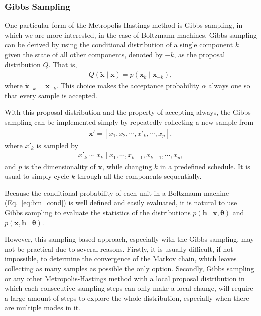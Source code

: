 \documentclass[dissertation,nocontribution,draft*]{aaltoseries}
\newcommand{\vect}[1]{\mathbf{#1}}
\newcommand{\vects}[1]{\boldsymbol{#1}}
\newcommand{\vh}[0]{\vect{h}}
\newcommand{\vx}[0]{\vect{x}}
\newcommand{\TT}[0]{{\vects{\theta}}}
\begin{document}
\subsubsection{Gibbs Sampling}
\label{sec:gibbs}

One particular form of the Metropolis-Hastings method is
Gibbs sampling, in which we are more interested, in the case
of Boltzmann machines. Gibbs sampling can be derived by
using the conditional distribution of a single component $k$
given the state of all other components, denoted by $-k$, as
the proposal distribution $Q$. That is,
\begin{align*}
    Q(\tilde{\vx} \mid \vx) = p(\vx_k \mid \vx_{-k}),
\end{align*}
where $\tilde{\vx}_{-k} = \vx_{-k}$.
This choice makes the acceptance probability $\alpha$ always
one so that every sample is accepted.

With this proposal distribution and the property of
accepting always, the Gibbs sampling can be implemented
simply by repeatedly collecting a new sample from
\begin{align*}
    \vx' = \left[ x_1, x_2, \cdots,
    x'_k, \cdots, x_p \right],
\end{align*}
where $x'_k$ is sampled by
\begin{align*}
    x'_k \sim x_k \mid x_1, \cdots, x_{k-1},
    x_{k+1}, \cdots, x_p,
\end{align*}
and $p$ is the dimensionality of $\vx$, while changing $k$
in a predefined schedule. It is usual to simply cycle $k$
through all the components sequentially.

Because the conditional probability of each unit in a
Boltzmann machine (Eq.~\eqref{eq:bm_cond}) is well defined
and easily evaluated, it is natural to use Gibbs
sampling to evaluate the statistics of the distributions
$p(\vh \mid \vx, \TT)$ and $p(\vx, \vh \mid \TT)$. 

However, this sampling-based approach, especially with the
Gibbs sampling, may not be practical due to several reasons.
Firstly, it is usually difficult, if not impossible, to
determine the convergence of the Markov chain, which leaves
collecting as many samples as possible the only option.
Secondly, Gibbs sampling or any other
Metropolis-Hastings method with a local proposal
distribution in which each consecutive sampling steps can
only make a local change, will require a large amount of
steps to
explore the whole distribution, especially when there are multiple modes
in it. 
\end{document}
